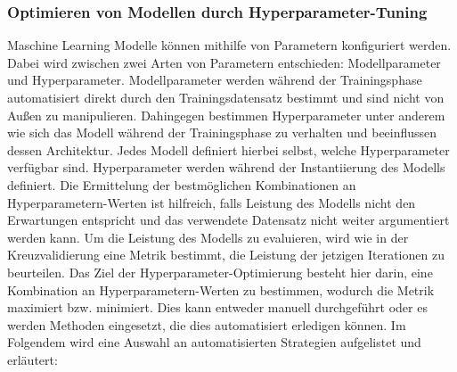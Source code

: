 \pagebreak

\subsubsection*{Optimieren von Modellen durch Hyperparameter-Tuning}
Maschine Learning Modelle können mithilfe von Parametern konfiguriert werden. Dabei wird zwischen zwei Arten von Parametern entschieden: Modellparameter und Hyperparameter.
Modellparameter werden während der Trainingsphase automatisiert direkt durch den Trainingsdatensatz bestimmt und sind nicht von Außen zu manipulieren. Dahingegen bestimmen Hyperparameter unter anderem wie sich das Modell während der Trainingsphase zu verhalten und beeinflussen
dessen Architektur. Jedes Modell definiert hierbei selbst, welche Hyperparameter verfügbar sind. Hyperparameter werden während der Instantiierung des Modells definiert. Die Ermittelung der bestmöglichen Kombinationen an Hyperparametern-Werten ist hilfreich, falls Leistung des Modells nicht den Erwartungen entspricht und das verwendete Datensatz nicht weiter argumentiert werden kann.
Um die Leistung des Modells zu evaluieren, wird wie in der Kreuzvalidierung eine Metrik bestimmt, die Leistung der jetzigen Iterationen zu beurteilen. Das Ziel der Hyperparameter-Optimierung besteht hier darin, eine Kombination an Hyperparametern-Werten zu bestimmen, wodurch die Metrik maximiert bzw. minimiert. 
Dies kann entweder manuell durchgeführt oder es werden Methoden eingesetzt, die dies automatisiert erledigen können. Im Folgendem wird eine Auswahl an automatisierten Strategien aufgelistet und erläutert:

